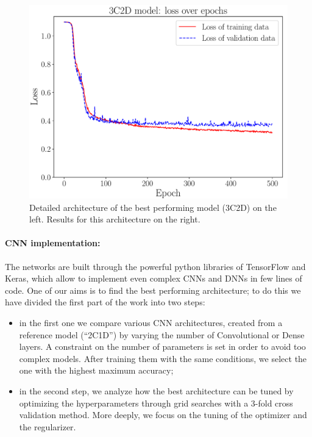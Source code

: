\documentclass[prl,twocolumn]{revtex4-1}
\begin{document}
\begin{figure}[!tb]
\begin{minipage}{0.66\columnwidth}
        \includegraphics[width=\textwidth]{Images/Results/3C2D_losses.pdf}
    \end{minipage}
    
    \caption{Detailed architecture of the best performing model (3C2D) on the left. Results for this architecture on the right.}
    \label{fig:best_accu}
\end{figure}



\paragraph{\bf CNN implementation:}
The networks are built through the powerful python libraries of TensorFlow and Keras, which allow to implement even complex CNNs and DNNs in few lines of code. One of our aims is to find the best performing architecture; to do this we have divided the first part of the work into two steps:
\begin{itemize}
    \item in the first one we compare various CNN architectures, created from a reference model (``2C1D'') by varying the number of Convolutional or Dense layers. A constraint on the number of parameters is set in order to avoid too complex models. After training them with the same conditions, we select the one with the highest maximum accuracy;
    \item in the second step, we analyze how the best architecture can be tuned by optimizing the hyperparameters through grid searches with a $3$-fold cross validation method. More deeply, we focus on the tuning of the optimizer and the regularizer.
\end{itemize}
\end{document}
